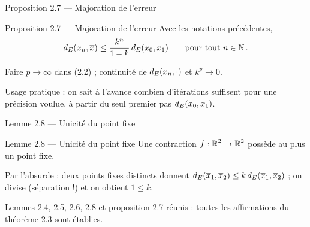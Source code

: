 \begin{frame}{Proposition 2.7 --- Majoration de l'erreur}
  \begin{Enonce}{Proposition 2.7 --- Majoration de l'erreur}
    Avec les notations précédentes,
    \[
      d_E(x_n,\overline{x})\leq\frac{k^n}{1-k}\,d_E(x_0,x_1)
      \qquad\text{pour tout } n\in\operatorname{\mathbb{N}}.
    \]
  \end{Enonce}
  \begin{AuTableau}
    \small Faire $p\to\infty$ dans (2.2) ; continuité de
    $d_E(x_n,\cdot)$ et $k^p\to0$.
  \end{AuTableau}
  \vspace{4pt}
  \small Usage pratique : on sait à l'avance combien
  d'itérations suffisent pour une précision voulue, à partir du seul
  premier pas $d_E(x_0,x_1)$.
\end{frame}

\begin{frame}{Lemme 2.8 --- Unicité du point fixe}
  \begin{Enonce}{Lemme 2.8 --- Unicité du point fixe}
    Une contraction $f:\operatorname{\mathbb{R}}^2\to\operatorname{\mathbb{R}}^2$ possède au plus un point fixe.
  \end{Enonce}
  \begin{AuTableau}
    \small Par l'absurde : deux points fixes distincts donnent
    $d_E(\overline{x}_1,\overline{x}_2)\leq k\,d_E(\overline{x}_1,\overline{x}_2)$ ;
    on divise (séparation !) et on obtient $1\leq k$.
  \end{AuTableau}
  \vspace{6pt}
  \small Lemmes 2.4, 2.5, 2.6, 2.8 et proposition 2.7 réunis :
  toutes les affirmations du théorème 2.3 sont établies.
\end{frame}

